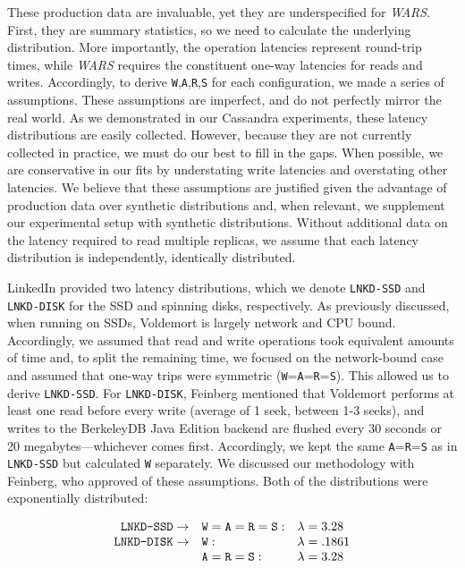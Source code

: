 \documentclass{vldb}
\begin{document}
These production data are invaluable, yet they are underspecified for
\textit{WARS}.  First, they are summary statistics, so we need to
calculate the underlying distribution.  More importantly, the
operation latencies represent round-trip times, while \textit{WARS}
requires the constituent one-way latencies for reads and writes.
Accordingly, to derive \texttt{W},\texttt{A},\texttt{R},\texttt{S} for
each configuration, we made a series of assumptions.  These
assumptions are imperfect, and do not perfectly mirror the real world.
As we demonstrated in our Cassandra experiments, these latency
distributions are easily collected.  However, because they are not
currently collected in practice, we must do our best to fill in the
gaps.  When possible, we are conservative in our fits by understating
write latencies and overstating other latencies.  We believe that
these assumptions are justified given the advantage of production data
over synthetic distributions and, when relevant, we supplement our
experimental setup with synthetic distributions.  Without additional
data on the latency required to read multiple replicas, we assume that
each latency distribution is independently, identically distributed.

LinkedIn provided two latency distributions, which we denote
\texttt{LNKD-SSD} and \texttt{LNKD-DISK} for the SSD and spinning
disks, respectively.  As previously discussed, when running on SSDs,
Voldemort is largely network and CPU bound.  Accordingly, we assumed
that read and write operations took equivalent amounts of time and, to
split the remaining time, we focused on the network-bound case and
assumed that one-way trips were symmetric
(\texttt{W}=\texttt{A}=\texttt{R}=\texttt{S}).  This allowed us to
derive \texttt{LNKD-SSD}.  For \texttt{LNKD-DISK}, Feinberg mentioned
that Voldemort performs at least one read before every write (average
of 1 seek, between 1-3 seeks), and writes to the BerkeleyDB Java
Edition backend are flushed every 30 seconds or 20
megabytes---whichever comes first.  Accordingly, we kept the same
\texttt{A}=\texttt{R}=\texttt{S} as in \texttt{LNKD-SSD} but
calculated \texttt{W} separately.  We discussed our methodology with
Feinberg, who approved of these assumptions.  Both of the
distributions were exponentially distributed:\vspace{-2mm}

\begin{equation*}
 \begin{array}{rll}
\texttt{LNKD-SSD} \rightarrow & \texttt{W} = \texttt{A}= \texttt{R} = \texttt{S}: & \lambda = 3.28\\
\texttt{LNKD-DISK} \rightarrow & \texttt{W}: & \lambda = .1861\\
&  \texttt{A} = \texttt{R} = \texttt{S}: & \lambda = 3.28$$\\
\end{array}
\end{equation*}
\end{document}
